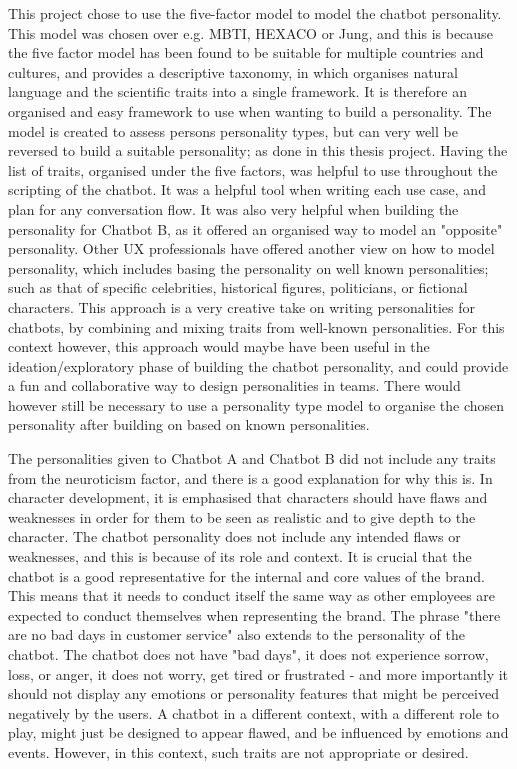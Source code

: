 This project chose to use the five-factor model to model the chatbot personality. This model was chosen over e.g. MBTI, HEXACO or Jung, and this is because the five factor model has been found to be suitable for multiple countries and cultures, and provides a descriptive taxonomy, in which organises natural language and the scientific traits into a single framework. It is therefore an organised and easy framework to use when wanting to build a personality. The model is created to assess persons personality types, but can very well be reversed to build a suitable personality; as done in this thesis project. Having the list of traits, organised under the five factors, was helpful to use throughout the scripting of the chatbot. It was a helpful tool when writing each use case, and plan for any conversation flow. It was also very helpful when building the personality for Chatbot B, as it offered an organised way to model an "opposite" personality. Other UX professionals have offered another view on how to model personality, which includes basing the personality on well known personalities; such as that of specific celebrities, historical figures, politicians, or fictional characters. This approach is a very creative take on writing personalities for chatbots, by combining and mixing traits from well-known personalities. For this context however, this approach would maybe have been useful in the ideation/exploratory phase of building the chatbot personality, and could provide a fun and collaborative way to design personalities in teams. There would however still be necessary to use a personality type model to organise the chosen personality after building on based on known personalities. 

The personalities given to Chatbot A and Chatbot B did not include any traits from the neuroticism factor, and there is a good explanation for why this is. In character development, it is emphasised that characters should have flaws and weaknesses in order for them to be seen as realistic and to give depth to the character. The chatbot personality does not include any intended flaws or weaknesses, and this is because of its role and context. It is crucial that the chatbot is a good representative for the internal and core values of the brand. This means that it needs to conduct itself the same way as other employees are expected to conduct themselves when representing the brand. The phrase "there are no bad days in customer service" also extends to the personality of the chatbot. The chatbot does not have "bad days", it does not experience sorrow, loss, or anger, it does not worry, get tired or frustrated - and more importantly it should not display any emotions or personality features that might be perceived negatively by the users. A chatbot in a different context, with a different role to play, might just be designed to appear flawed, and be influenced by emotions and events. However, in this context, such traits are not appropriate or desired.


